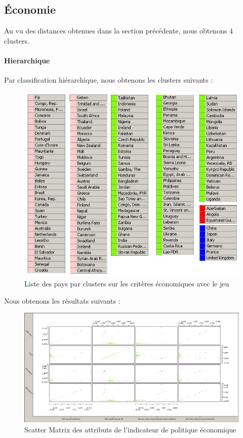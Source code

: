 \subsection{Économie}
Au vu des distances obtenues dans la section précédente, nous obtenons 4 clusters.

\paragraph{Hierarchique} Par classification hiérarchique, nous obtenons les clusters suivants :

\begin{figure}[H]
	\begin{center}
		\includegraphics[scale=0.5]{Image/TableViewPolitiqueNoMissing2}
		\caption{Liste des pays par clusters sur les critères économiques avec le jeu \jeuc}
	\end{center}
\end{figure}


Nous obtenons les résultats suivants : 

\begin{figure}[H]
	\begin{center}
		\includegraphics[scale=0.5]{Image/ScatterMatrixPolitiqueNoMissing2}
		\caption{Scatter Matrix des attributs de l'indicateur de politique économique \jeuc}
	\end{center}
\end{figure}

